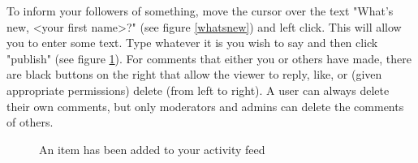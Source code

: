 \documentclass[10pt]{article}
\begin{document}
\begin{flushleft}
To inform your followers of something, move the cursor over the text "What's new, <your first name>?" (see figure \ref{whatsnew}) and left click. This will allow you to enter some text.  Type whatever it is you wish to say and then click "publish" (see figure \ref{bowwow}).  For comments that either you or others have made, there are black buttons on the right that allow the viewer to reply, like, or (given appropriate permissions) delete (from left to right).  A user can always delete their own comments, but only moderators and admins can delete the comments of others.   
\end{flushleft}

\begin{figure}[h]
    \centering
    \qquad
    \caption{An item has been added to your activity feed}
    \label{bowwow}
\end{figure}
\end{document}
